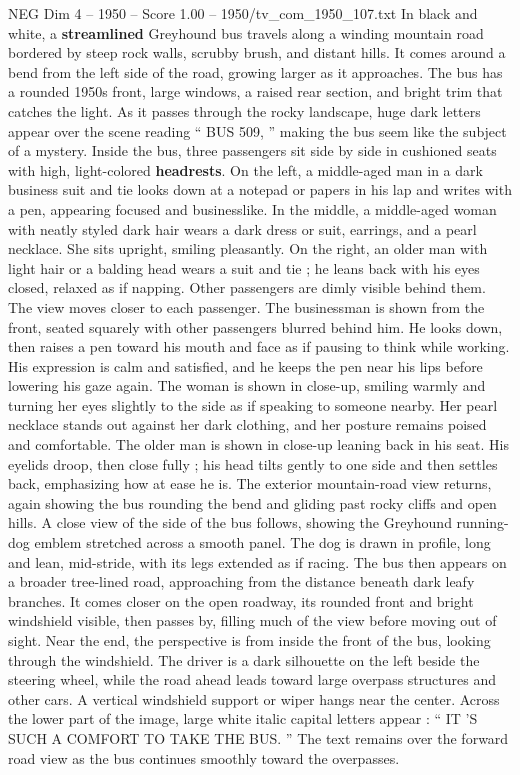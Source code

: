 \begin{textsample}{NEG Dim 4 – 1950 – Score 1.00 – 1950/tv\_com\_1950\_107.txt}  \label{ex:f4_neg_067}
In black and white, a \textbf{streamlined} Greyhound bus travels along a winding mountain road bordered by steep rock walls, scrubby brush, and distant hills.
It comes around a bend from the left side of the road, growing larger as it approaches.
The bus has a rounded 1950s front, large windows, a raised rear section, and bright trim that catches the light.
As it passes through the rocky landscape, huge dark letters appear over the scene reading “ BUS 509, ” making the bus seem like the subject of a mystery.
Inside the bus, three passengers sit side by side in cushioned seats with high, light-colored \textbf{headrests}.
On the left, a middle-aged man in a dark business suit and tie looks down at a notepad or papers in his lap and writes with a pen, appearing focused and businesslike.
In the middle, a middle-aged woman with neatly styled dark hair wears a dark dress or suit, earrings, and a pearl necklace.
She sits upright, smiling pleasantly.
On the right, an older man with light hair or a balding head wears a suit and tie ; he leans back with his eyes closed, relaxed as if napping.
Other passengers are dimly visible behind them.
The view moves closer to each passenger.
The businessman is shown from the front, seated squarely with other passengers blurred behind him.
He looks down, then raises a pen toward his mouth and face as if pausing to think while working.
His expression is calm and satisfied, and he keeps the pen near his lips before lowering his gaze again.
The woman is shown in close-up, smiling warmly and turning her eyes slightly to the side as if speaking to someone nearby.
Her pearl necklace stands out against her dark clothing, and her posture remains poised and comfortable.
The older man is shown in close-up leaning back in his seat.
His eyelids droop, then close fully ; his head tilts gently to one side and then settles back, emphasizing how at ease he is.
The exterior mountain-road view returns, again showing the bus rounding the bend and gliding past rocky cliffs and open hills.
A close view of the side of the bus follows, showing the Greyhound running-dog emblem stretched across a smooth panel.
The dog is drawn in profile, long and lean, mid-stride, with its legs extended as if racing.
The bus then appears on a broader tree-lined road, approaching from the distance beneath dark leafy branches.
It comes closer on the open roadway, its rounded front and bright windshield visible, then passes by, filling much of the view before moving out of sight.
Near the end, the perspective is from inside the front of the bus, looking through the windshield.
The driver is a dark silhouette on the left beside the steering wheel, while the road ahead leads toward large overpass structures and other cars.
A vertical windshield support or wiper hangs near the center.
Across the lower part of the image, large white italic capital letters appear : “ IT ’S SUCH A COMFORT TO TAKE THE BUS. ” The text remains over the forward road view as the bus continues smoothly toward the overpasses.

\end{textsample}
